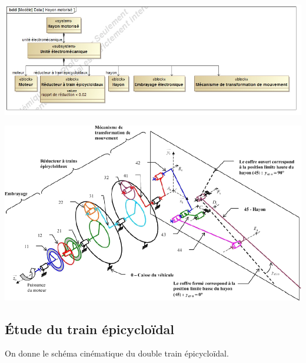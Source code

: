 \documentclass[10pt,fleqn]{article} %
\begin{document}
\begin{multicols}{2}
\begin{center}
\includegraphics[width=.95\linewidth]{images/SysML/BDD}
\end{center}


\begin{center}
\includegraphics[width=.95\linewidth]{images/A6_schema}
\end{center}

\subsection*{Étude du train épicycloïdal}
On donne le schéma cinématique du double train épicycloïdal. 

\vspace{.25cm}


\end{multicols}
\end{document}

